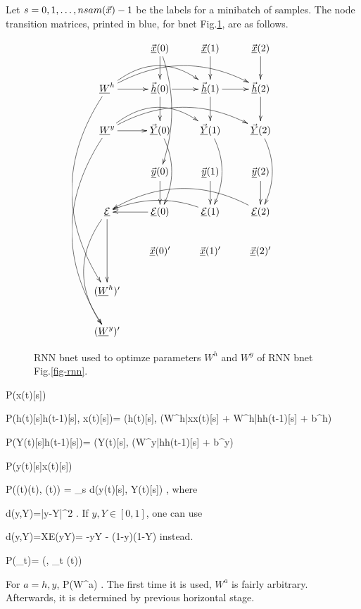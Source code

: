 Let $s=0,1, \ldots, nsam({\vec{x}})-1$
be the labels for a minibatch of samples.
The node transition matrices,
 printed in blue,
for bnet Fig.\ref{fig-rnn-ext},
 are as follows.



\begin{figure}[h!]
\centering
$$\xymatrix{
&\vec{\rvx}(0)\ar[d]\ar@/^1pc/[ddd]&
\vec{\rvx}(1)\ar[d]&
\vec{\rvx}(2)\ar[d]\\
\rvW^h\ar[r]\ar@/^2pc/[rr]\ar@/^2pc/[rrr]
\ar@/_3pc/[ddddd]
&\vec{\rvh}(0)\ar[d]\ar[r]&
\vec{\rvh}(1)\ar[d]\ar[r]&
\vec{\rvh}(2)\ar[d]\\
\rvW^y\ar[r]\ar@/^2pc/[rr]\ar@/^2pc/[rrr]
\ar@/_3pc/[ddddd]
&\vec{\rvY}(0)\ar@/^1pc/[dd]&
\vec{\rvY}(1)\ar@/^1pc/[dd]&
\vec{\rvY}(2)\ar@/^1pc/[dd]
\\
&
\vec{\rvy}(0)\ar[d]&
\vec{\rvy}(1)\ar[d]&
\vec{\rvy}(2)\ar[d]
\\
\ul{\cale}\ar[dd]
\ar@/_2pc/[ddd]&
\ul{\cale}(0)\ar[l]&
\ul{\cale}(1)\ar@/_1pc/[ll]&
\ul{\cale}(2)\ar@/_2pc/[lll]
\\
&
\vec{\rvx}(0)'
&\vec{\rvx}(1)'
&\vec{\rvx}(2)'
\\
(\rvW^h)'\\
(\rvW^y)'
}
$$
\caption{RNN bnet used
to optimze parameters $W^h$
and $W^y$ of RNN bnet Fig.\ref{fig-rnn}.}
\label{fig-rnn-ext}
\end{figure}

\beq\color{blue}
P(x(t)[s])
\eeq

\beq\color{blue}
P(h(t)[s]\cond h(t-1)[s], x(t)[s])=
\delta(h(t)[s],
\cala(W^{h|x}x(t)[s] + W^{h|h}h(t-1)[s] + b^h)
\eeq

\beq\color{blue}
P(Y(t)[s]\cond h(t-1)[s])=
\delta(Y(t)[s],
\cala(W^{y|h}h(t-1)[s] + b^y)
\eeq

\beq\color{blue}
P(y(t)[s]\cond x(t)[s])
\eeq

\beq\color{blue}
P(\cale(t)\cond \vecy(t), (t))
=
\sum_s d(y(t)[s], Y(t)[s])
\;,
\eeq
where 

\beq
d(y,Y)=|y-Y|^2
\;.
\eeq
If $y, Y\in [0,1]$, 
one can use 

\beq
d(y,Y)=XE(y\rarrow Y)=
-y\log Y - (1-y)\log (1-Y)
\eeq
instead.

\beq\color{blue}
P(\cale\cond [\cale(t)]_{\forall t})=
\delta(\cale, \sum_t \cale(t))
\eeq

For $a=h,y$,
\beq\color{blue}
P(W^a)
\;.
\eeq
The first time it is used,
$W^a$ is fairly arbitrary. Afterwards,
it is determined by previous 
horizontal
stage.

